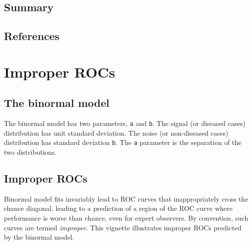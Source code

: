 \documentclass[]{book}
\begin{document}
\hypertarget{summary-6}{%
\section{Summary}\label{summary-6}}

\hypertarget{references-11}{%
\section{References}\label{references-11}}

\hypertarget{ImproperROCs}{%
\chapter{Improper ROCs}\label{ImproperROCs}}

\hypertarget{the-binormal-model}{%
\section{The binormal model}\label{the-binormal-model}}

The binormal model has two parameters, \texttt{a} and \texttt{b}. The signal (or diseased cases) distribution has unit standard deviation.
The noise (or non-diseased cases) distribution has standard deviation \texttt{b}. The \texttt{a} parameter is the separation of the two distributions.

\hypertarget{improper-rocs}{%
\section{Improper ROCs}\label{improper-rocs}}

Binormal model fits invariably lead to ROC curves that inappropriately cross the chance diagonal, leading to a prediction of a region of the ROC curve where performance is worse than chance, even for expert observers. By convention, such curves are termed \emph{improper}. This vignette illustrates improper ROCs predicted by the binormal model.
\end{document}
